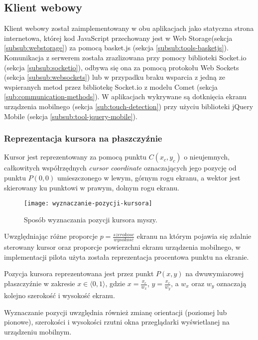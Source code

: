 \subsection{Klient webowy}

Klient webowy został zaimplementowany w obu aplikacjach jako statyczna strona internetowa, której kod JavaScript przechowany jest w Web Storage(sekcja \ref{subsub:webstorage}) za pomocą basket.js (sekcja \ref{subsub:tools-basketjs}). Komunikacja z serwerem została zrazlizowana przy pomocy biblioteki Socket.io (sekcja \ref{subsub:socketio}), odbywa się ona za pomocą protokołu Web Sockets (sekcja \ref{subsub:websockets}) lub w przypadku braku wsparcia z jedną ze wspieranych metod przez bibliotekę Socket.io z modelu Comet (sekcja \ref{sub:communication-methods}). W aplikacjach wykrywane są dotknięcia ekranu urządzenia mobilnego (sekcja \ref{sub:touch-detection}) przy użyciu biblioteki jQuery Mobile (sekcja \ref{subsub:tool-jquery-mobile}).

\subsubsection{Reprezentacja kursora na płaszczyźnie}
\label{subsub:cursor-representation}

Kursor jest reprezentowany za pomocą punktu \(C(x_{c}, y_{c})\) o nieujemnych, całkowitych współrzędnych \emph{cursor coordinate} oznaczających jego pozycję od punktu \(P(0, 0)\) umieszczonego w lewym, górnym rogu ekranu, a wektor jest skierowany ku punktowi w prawym, dolnym rogu ekranu.

\begin{figure}[h!]
  \caption{Sposób wyznaczania pozycji kursora myszy.}
  \centering
    \texttt{[image: wyznaczanie-pozycji-kursora]}
\end{figure}

Uwzględniając różne proporcje \(p = \frac{szerokosc}{wysokosc}\) ekranu na którym pojawia się zdalnie sterowany kursor oraz proporcje powierzchni ekranu urządzenia mobilnego, w implementacji pilota użyta została reprezentacja procentowa punktu na ekranie.

Pozycja kursora reprezentowana jest przez punkt \(P(x, y)\) na dwuwymiarowej płaszczyźnie w zakresie \( x\in \langle0, 1\rangle \), gdzie \(x = \frac{x_{c}}{w_{x}}\), \(y = \frac{x_{c}}{w_{y}}\), a \(w_{x}\) oraz \(w_{y}\) oznaczają kolejno szerokość i wysokość ekranu.

Wyznaczanie pozycji uwzględnia również zmianę orientacji (poziomej lub pionowe), szerokości i wysokości rzutni okna przeglądarki wyświetlanej na urządzeniu mobilnym.

